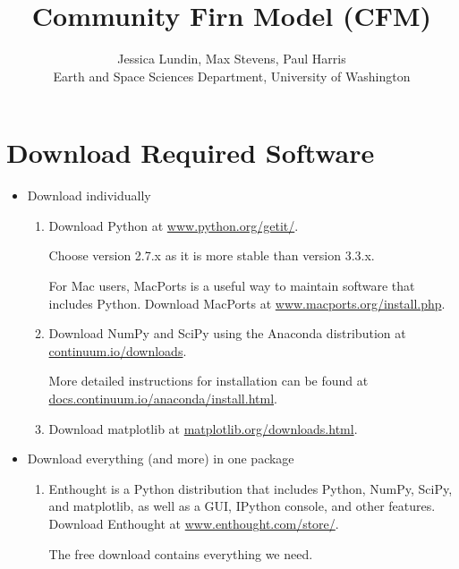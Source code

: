 \documentclass{article}
\begin{document}
\title{Community Firn Model (CFM)}
\author{Jessica Lundin, Max Stevens, Paul Harris\\ Earth and Space Sciences Department, University of Washington}

\maketitle
\newpage

\section{Download Required Software}


\begin{itemize}
  \item Download individually
  \begin{enumerate}
    \item Download Python at \href{http://www.python.org/getit/}{www.python.org/getit/}.

    Choose version 2.7.x as it is more stable than version 3.3.x.

    For Mac users, MacPorts is a useful way to maintain software that includes Python. Download MacPorts at \href{http://www.macports.org/install.php}{www.macports.org/install.php}.
    
    \item Download NumPy and SciPy using the Anaconda distribution at \href{http://continuum.io/downloads}{continuum.io/downloads}.

    More detailed instructions for installation can be found at \href{http://docs.continuum.io/anaconda/install.html}{docs.continuum.io/anaconda/install.html}.
    
    \item Download matplotlib at \href{http://matplotlib.org/downloads.html}{matplotlib.org/downloads.html}.

  \end{enumerate}
  \item Download everything (and more) in one package
  
  \begin{enumerate}
    \item Enthought is a Python distribution that includes Python, NumPy, SciPy, and matplotlib, as well as a GUI, IPython console, and other features. Download Enthought at \href{https://www.enthought.com/store/}{www.enthought.com/store/}.

    The free download contains everything we need.
  \end{enumerate}
\end{itemize}
\end{document}
